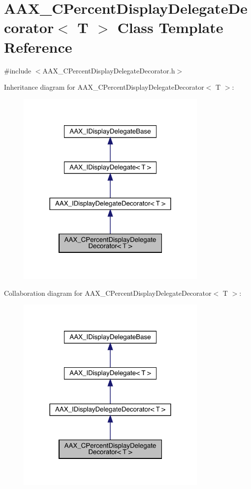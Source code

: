 \hypertarget{a01549}{}\section{A\+A\+X\+\_\+\+C\+Percent\+Display\+Delegate\+Decorator$<$ T $>$ Class Template Reference}
\label{a01549}


{\ttfamily \#include $<$A\+A\+X\+\_\+\+C\+Percent\+Display\+Delegate\+Decorator.\+h$>$}



Inheritance diagram for A\+A\+X\+\_\+\+C\+Percent\+Display\+Delegate\+Decorator$<$ T $>$\+:
\nopagebreak
\begin{figure}[H]
\begin{center}
\leavevmode
\includegraphics[width=264pt]{a01548}
\end{center}
\end{figure}


Collaboration diagram for A\+A\+X\+\_\+\+C\+Percent\+Display\+Delegate\+Decorator$<$ T $>$\+:
\nopagebreak
\begin{figure}[H]
\begin{center}
\leavevmode
\includegraphics[width=264pt]{a01547}
\end{center}
\end{figure}


